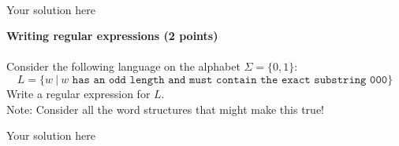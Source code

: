 \documentclass[12pt]{article}
\newenvironment{question}[2][Question]{\begin{trivlist}
\item[\hskip \labelsep {\bfseries #1}\hskip \labelsep {\bfseries #2.}]}{\end{trivlist}}
\newenvironment{solution}[1][Solution:]{\begin{trivlist}
\item[\hskip \labelsep {\bfseries #1}\hskip \labelsep {\bfseries}]\color{blue}}{\end{trivlist}}
\begin{document}
\begin{solution}
\;\\

Your solution here
\end{solution}


\clearpage
\begin{question}{4}\textbf{Writing regular expressions (2 points)}\\\\
Consider the following language on the alphabet $\Sigma = \{0,1\}$:
\[L = \{w \ | \ w \texttt{ has an odd length and must contain the exact substring 000}\}\]
Write a regular expression for $L$.
\;\\
Note: Consider all the word structures that might make this true!
\end{question}

\begin{solution}

\;

            Your solution here


\end{solution}
\end{document}
